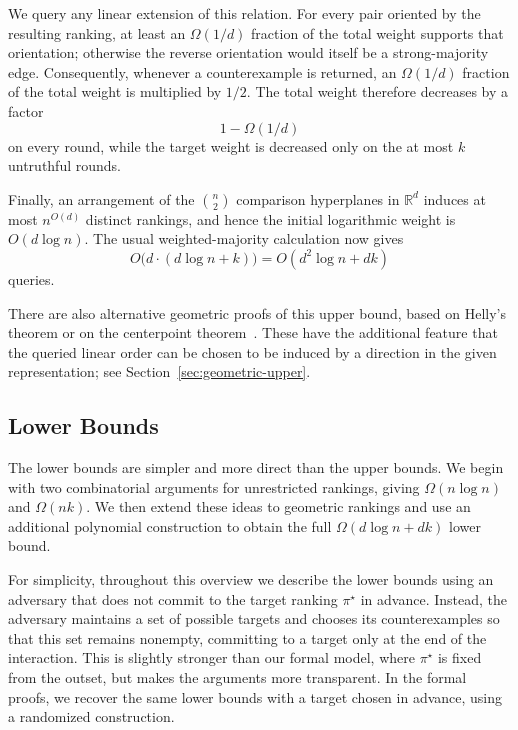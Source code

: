 \documentclass[11pt]{article}
\theoremstyle{definition}
\theoremstyle{remark}
\begin{document}
We query any linear extension of this relation. For every pair oriented by
the resulting ranking, at least an $\Omega(1/d)$ fraction of the total weight
supports that orientation; otherwise the reverse orientation would itself be
a strong-majority edge. Consequently, whenever a counterexample is returned,
an $\Omega(1/d)$ fraction of the total weight is multiplied by $1/2$.
The total weight therefore decreases by a factor
\[
    1-\Omega(1/d)
\]
on every round, while the target weight is decreased only on the at most
$k$ untruthful rounds.

Finally, an arrangement of the $\binom n2$ comparison hyperplanes in
$\mathbb R^d$ induces at most $n^{O(d)}$ distinct rankings, and hence the
initial logarithmic weight is $O(d\log n)$. The usual weighted-majority
calculation now gives
\[
    O\bigl(d\cdot(d\log n+k)\bigr)
    =
    O(d^2\log n+dk)
\]
queries.

There are also alternative geometric proofs of this upper bound, based on
Helly's theorem or on the centerpoint theorem~\cite{Matousek2002}. These have
the additional feature that the queried linear order can be chosen to be
induced by a direction in the given representation; see
Section~\ref{sec:geometric-upper}.

\subsection{Lower Bounds}

The lower bounds are simpler and more direct than the upper
bounds. We begin with two combinatorial arguments for unrestricted rankings,
giving $\Omega(n\log n)$ and $\Omega(nk)$. We then extend these ideas to
geometric rankings and use an additional polynomial construction to obtain
the full $\Omega(d\log n+dk)$ lower bound.

For simplicity, throughout this overview we describe the lower bounds using
an adversary that does not commit to the target ranking $\pi^\star$ in
advance. Instead, the adversary maintains a set of possible targets and
chooses its counterexamples so that this set remains nonempty, committing to
a target only at the end of the interaction. This is slightly stronger than
our formal model, where $\pi^\star$ is fixed from the outset, but makes the
arguments more transparent. In the formal proofs, we recover the same lower
bounds with a target chosen in advance, using a randomized construction.
\end{document}
